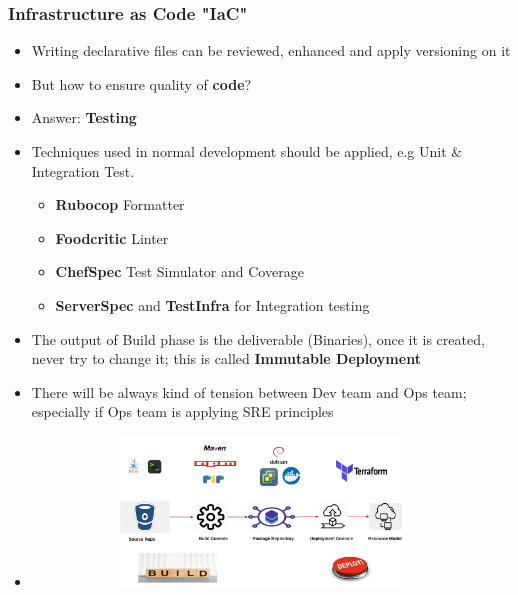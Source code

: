 \documentclass{beamer}
\begin{document}
	\begin{frame}
		\frametitle{Infrastructure as Code \textbf{"IaC"}}
		\begin{itemize}
			\item<1-> \scriptsize{Writing declarative files can be reviewed, enhanced and  apply versioning on it}
			\item<2-> \scriptsize{\alert{But how to ensure quality of \textbf{code}?}}
			\item<3-> \scriptsize{Answer: \textbf{Testing}}
			\item<4-> \scriptsize{Techniques used in normal development should be applied, e.g Unit \& Integration Test}. 
				\begin{itemize} 
					\item \scriptsize{\textbf{Rubocop} Formatter}
					\item \scriptsize{\textbf{Foodcritic} Linter}
					\item \scriptsize{\textbf{ChefSpec} Test Simulator and Coverage}
					\item \scriptsize{\textbf{ServerSpec} and \textbf{TestInfra} for Integration testing}
				\end{itemize}
			\item<5-> \scriptsize{The output of Build phase is the deliverable (Binaries), once it is created, never try to change it; this is called \textbf{Immutable Deployment}}
			\item<6-> \scriptsize{There will be always kind of tension between Dev team and Ops team; especially if Ops team is applying SRE principles}
			\item<1->[]
			\begin{figure}[h]
				\includegraphics[width=100mm,height= 40mm, scale=1]{img/service-delivery-platform.png}
			\end{figure}
		\end{itemize}
	\end{frame}
	
\end{document}
